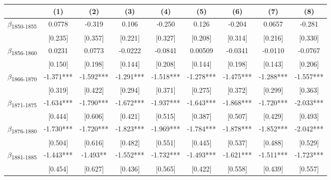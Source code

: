 {
\def\sym#1{\ifmmode^{#1}\else\(^{#1}\)\fi}
\begin{tabular}{l*{8}{c}}
\toprule
            &\multicolumn{1}{c}{(1)}   &\multicolumn{1}{c}{(2)}   &\multicolumn{1}{c}{(3)}   &\multicolumn{1}{c}{(4)}   &\multicolumn{1}{c}{(5)}   &\multicolumn{1}{c}{(6)}   &\multicolumn{1}{c}{(7)}   &\multicolumn{1}{c}{(8)}   \\
\midrule
$\beta$\textsubscript{1850-1855}&      0.0778   &      -0.319   &       0.106   &      -0.250   &       0.126   &      -0.204   &      0.0657   &      -0.281   \\
            &     [0.235]   &     [0.357]   &     [0.221]   &     [0.327]   &     [0.208]   &     [0.314]   &     [0.216]   &     [0.330]   \\
$\beta$\textsubscript{1856-1860}&      0.0231   &      0.0773   &     -0.0222   &     -0.0841   &     0.00509   &     -0.0341   &     -0.0110   &     -0.0767   \\
            &     [0.150]   &     [0.198]   &     [0.144]   &     [0.208]   &     [0.144]   &     [0.198]   &     [0.143]   &     [0.206]   \\
$\beta$\textsubscript{1866-1870}&      -1.371***&      -1.592***&      -1.291***&      -1.518***&      -1.278***&      -1.475***&      -1.288***&      -1.557***\\
            &     [0.319]   &     [0.422]   &     [0.294]   &     [0.371]   &     [0.275]   &     [0.372]   &     [0.299]   &     [0.363]   \\
$\beta$\textsubscript{1871-1875}&      -1.634***&      -1.790***&      -1.672***&      -1.937***&      -1.643***&      -1.868***&      -1.720***&      -2.033***\\
            &     [0.444]   &     [0.606]   &     [0.421]   &     [0.515]   &     [0.387]   &     [0.507]   &     [0.429]   &     [0.493]   \\
$\beta$\textsubscript{1876-1880}&      -1.730***&      -1.720***&      -1.823***&      -1.969***&      -1.784***&      -1.878***&      -1.852***&      -2.042***\\
            &     [0.504]   &     [0.616]   &     [0.482]   &     [0.551]   &     [0.445]   &     [0.537]   &     [0.488]   &     [0.529]   \\
$\beta$\textsubscript{1881-1885}&      -1.443***&      -1.493** &      -1.552***&      -1.732***&      -1.493***&      -1.621***&      -1.511***&      -1.723***\\
            &     [0.454]   &     [0.627]   &     [0.436]   &     [0.565]   &     [0.422]   &     [0.558]   &     [0.439]   &     [0.557]   \\

\end{tabular}}
